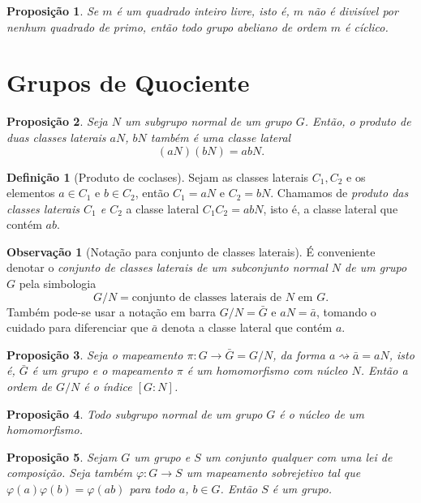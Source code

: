 \documentclass[a4paper,12pt]{report}
\theoremstyle{plain}
\newtheorem{proposicao}{Proposição}[section]
\theoremstyle{definition}
\newtheorem{definicao}{Definição}[section]
\newtheorem{observacao}{Observação}[section]
\begin{document}
\begin{proposicao}
	Se $m$ é um \emph{quadrado inteiro livre}, isto é, $m$ não é divisível por nenhum quadrado de primo, então todo grupo abeliano de ordem $m$ é cíclico.
\end{proposicao}

\section{Grupos de Quociente}

\begin{proposicao}
	Seja \(N\) um subgrupo normal de um grupo \(G\).
	Então, o produto de duas classes laterais \(aN\), \(bN\) também é uma classe lateral
	\[(aN) (bN) = abN.\]
\end{proposicao}

\begin{definicao}[Produto de coclases]
	Sejam as classes laterais \(C_1, C_2\) e os elementos
	\(a\in C_1\) e \(b\in C_2\), então \(C_1 = aN\) e \(C_2 = bN\). Chamamos
	de \emph{produto das classes laterais \(C_1\) e \(C_2\)} a classe lateral
	\(C_1C_2 = abN\), isto é, a classe lateral que contém \(ab\).	
\end{definicao}

\begin{observacao}[Notação para conjunto de classes laterais]
	É conveniente denotar o \emph{conjunto de classes laterais de um subconjunto normal \(N\) de um grupo \(G\)} pela simbologia \[G/N = \text{conjunto de classes laterais de }N\text{ em }G.\] Também pode-se	usar a notação em barra \(G/N = \bar G\) e \(aN = \bar a\), tomando o
	cuidado para diferenciar que \(\bar a\) denota a classe lateral que contém
	\(a\).	
\end{observacao}

\begin{proposicao}
	Seja o mapeamento \(\pi: G \longrightarrow \bar G = G/N\), da forma
	\(a \rightsquigarrow \bar a = aN\), isto é, \(\bar G\) é um grupo e o
	mapeamento \(\pi\) é um homomorfismo com núcleo \(N\). Então a ordem de
	\(G/N\) é o índice \([G:N]\).	
\end{proposicao}

\begin{proposicao}
	Todo subgrupo normal de um grupo \(G\) é o núcleo
	de um homomorfismo.	
\end{proposicao}

\begin{proposicao}
	Sejam \(G\) um grupo e \(S\) um conjunto qualquer
	com uma lei de composição. Seja também \(\varphi:G\longrightarrow S\) um
	mapeamento sobrejetivo tal que \(\varphi(a)\varphi(b) = \varphi(ab)\)
	para todo \(a\), \(b\in G\). Então \(S\) é um grupo.	
\end{proposicao}
\end{document}
